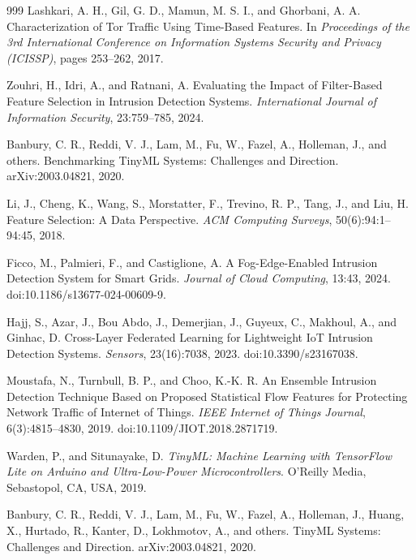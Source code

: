 \documentclass[journal,article,submit,moreauthors]{Definitions/mdpi}
\begin{document}
{\begin{thebibliography}{999}
Lashkari, A. H., Gil, G. D., Mamun, M. S. I., and Ghorbani, A. A. Characterization of Tor Traffic Using Time-Based Features. In \emph{Proceedings of the 3rd International Conference on Information Systems Security and Privacy (ICISSP)}, pages 253--262, 2017.

Zouhri, H., Idri, A., and Ratnani, A. Evaluating the Impact of Filter-Based Feature Selection in Intrusion Detection Systems. \emph{International Journal of Information Security}, 23:759--785, 2024.

Banbury, C. R., Reddi, V. J., Lam, M., Fu, W., Fazel, A., Holleman, J., and others. Benchmarking TinyML Systems: Challenges and Direction. arXiv:2003.04821, 2020.

Li, J., Cheng, K., Wang, S., Morstatter, F., Trevino, R. P., Tang, J., and Liu, H. Feature Selection: A Data Perspective. \emph{ACM Computing Surveys}, 50(6):94:1--94:45, 2018.

Ficco, M., Palmieri, F., and Castiglione, A. A Fog-Edge-Enabled Intrusion Detection System for Smart Grids. \emph{Journal of Cloud Computing}, 13:43, 2024. doi:10.1186/s13677-024-00609-9.

Hajj, S., Azar, J., Bou Abdo, J., Demerjian, J., Guyeux, C., Makhoul, A., and Ginhac, D. Cross-Layer Federated Learning for Lightweight IoT Intrusion Detection Systems. \emph{Sensors}, 23(16):7038, 2023. doi:10.3390/s23167038.

Moustafa, N., Turnbull, B. P., and Choo, K.-K. R. An Ensemble Intrusion Detection Technique Based on Proposed Statistical Flow Features for Protecting Network Traffic of Internet of Things. \emph{IEEE Internet of Things Journal}, 6(3):4815--4830, 2019. doi:10.1109/JIOT.2018.2871719.

Warden, P., and Situnayake, D. \emph{TinyML: Machine Learning with TensorFlow Lite on Arduino and Ultra-Low-Power Microcontrollers}. O'Reilly Media, Sebastopol, CA, USA, 2019.

Banbury, C. R., Reddi, V. J., Lam, M., Fu, W., Fazel, A., Holleman, J., Huang, X., Hurtado, R., Kanter, D., Lokhmotov, A., and others. TinyML Systems: Challenges and Direction. arXiv:2003.04821, 2020.

\end{thebibliography}
}


%
\end{document}
